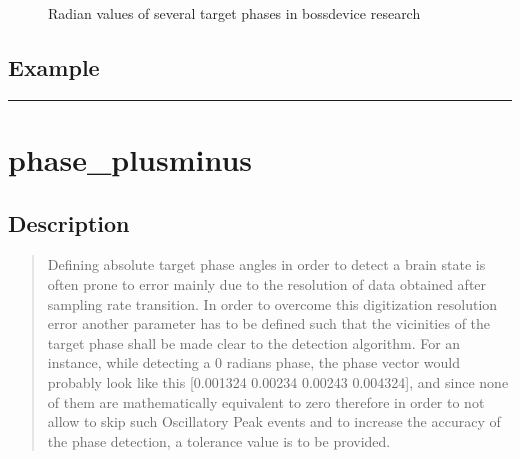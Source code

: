 \documentclass[letterpaper,10pt,english]{sphinxmanual}
\begin{document}
\begin{figure}[htbp]
\centering
\capstart

\noindent{}
\caption{Radian values of several target phases in bossdevice research}\label{\detokenize{4_api_documentation:id54}}\end{figure}


\subsection{Example}
\label{\detokenize{4_api_documentation:id25}}
\begin{sphinxVerbatim}[commandchars=\\\{\}]
\end{sphinxVerbatim}


\bigskip\hrule\bigskip



\section{phase\_plusminus}
\label{\detokenize{4_api_documentation:phase-plusminus}}

\subsection{Description}
\label{\detokenize{4_api_documentation:id26}}\begin{quote}

\sphinxAtStartPar
Defining absolute target phase angles in order to detect a brain state is often prone to error mainly due to the resolution of data obtained after sampling rate transition. In order to overcome this digitization resolution error another parameter has to be defined such that the vicinities of the target phase shall be made clear to the detection algorithm. For an instance, while detecting a 0 radians phase, the phase vector would probably look like this {[}\sphinxhyphen{}0.001324 \sphinxhyphen{}0.00234 0.00243 0.004324{]}, and since none of them are mathematically equivalent to zero therefore in order to not allow to skip such Oscillatory Peak events and to increase the accuracy of the phase detection, a tolerance value is to be provided.
\end{quote}
\end{document}
